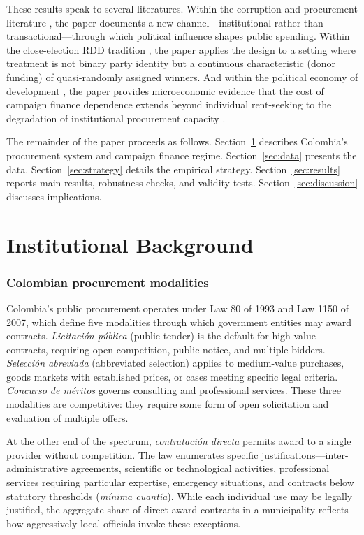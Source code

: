 \documentclass[12pt]{article}
\begin{document}
These results speak to several literatures. Within the corruption-and-procurement literature \citep{bandiera2009active, olken2007monitoring, best2023procurement}, the paper documents a new channel---institutional rather than transactional---through which political influence shapes public spending. Within the close-election RDD tradition \citep{lee2008randomized, eggers2015validity, caughey2011elections}, the paper applies the design to a setting where treatment is not binary party identity but a continuous characteristic (donor funding) of quasi-randomly assigned winners. And within the political economy of development \citep{mauro1995corruption, ferraz2011electoral, brollo2013political}, the paper provides microeconomic evidence that the cost of campaign finance dependence extends beyond individual rent-seeking to the degradation of institutional procurement capacity \citep{coviello2018publicprocurement}.

The remainder of the paper proceeds as follows. Section~\ref{sec:background} describes Colombia's procurement system and campaign finance regime. Section~\ref{sec:data} presents the data. Section~\ref{sec:strategy} details the empirical strategy. Section~\ref{sec:results} reports main results, robustness checks, and validity tests. Section~\ref{sec:discussion} discusses implications.


\section{Institutional Background}
\label{sec:background}

\subsubsection*{Colombian procurement modalities} Colombia's public procurement operates under Law 80 of 1993 and Law 1150 of 2007, which define five modalities through which government entities may award contracts. \textit{Licitaci\'{o}n p\'{u}blica} (public tender) is the default for high-value contracts, requiring open competition, public notice, and multiple bidders. \textit{Selecci\'{o}n abreviada} (abbreviated selection) applies to medium-value purchases, goods markets with established prices, or cases meeting specific legal criteria. \textit{Concurso de m\'{e}ritos} governs consulting and professional services. These three modalities are competitive: they require some form of open solicitation and evaluation of multiple offers.

At the other end of the spectrum, \textit{contrataci\'{o}n directa} permits award to a single provider without competition. The law enumerates specific justifications---inter-administrative agreements, scientific or technological activities, professional services requiring particular expertise, emergency situations, and contracts below statutory thresholds (\textit{m\'{i}nima cuant\'{i}a}). While each individual use may be legally justified, the aggregate share of direct-award contracts in a municipality reflects how aggressively local officials invoke these exceptions.
\end{document}
